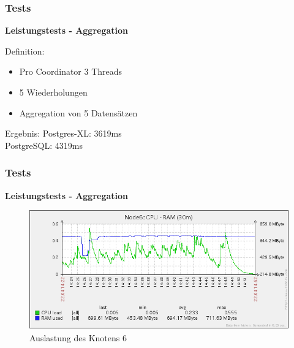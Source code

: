 \documentclass{beamer}
\begin{document}
\begin{frame}\frametitle{Tests}
\centering\textbf{Leistungstests - Aggregation}

\vspace{\baselineskip}

\begin{block}{Definition:}
\begin{itemize}
\item Pro Coordinator 3 Threads
\item 5 Wiederholungen
\item Aggregation von 5 Datensätzen %
\end{itemize}
\end{block}

\vspace{\baselineskip}

\begin{block}{Ergebnis:}
Postgres-XL: 3619ms\\
PostgreSQL: 4319ms
\end{block}
\end{frame}

\begin{frame}\frametitle{Tests}
\centering\textbf{Leistungstests - Aggregation}
\begin{figure}
\centering
\includegraphics[width=1\hsize]{jdbc_aggregation_Testlauf_node6.png}
\caption{Auslastung des Knotens 6}
\end{figure}
\end{frame}
\end{document}
